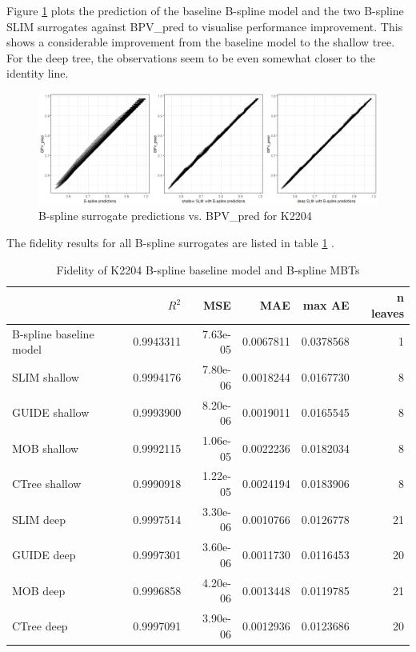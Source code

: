 Figure \ref{fig:ins_k2204_fit} plots the prediction of the baseline B-spline model and the two B-spline SLIM surrogates against BPV\_pred to visualise performance improvement. This shows a considerable improvement from the baseline model to the shallow tree. For the deep tree, the observations seem to be even somewhat closer to the identity line. 

\begin{figure}[!htb]
    \centering    
    \includegraphics[width = 14cm]{Figures/insurance_use_case/k2204_BPV/fit.png}
    \caption{B-spline surrogate predictions vs. BPV\_pred for K2204}
    \label{fig:ins_k2204_fit}
\end{figure}

The fidelity results for all B-spline surrogates are listed in table \ref{tab:ins_k2204_bsplines_surrogates_perf} .

\begin{table}

\caption{Fidelity of K2204 B-spline baseline model and  B-spline MBTs}
\centering \scriptsize
\begin{tabular}[t]{l|r|r|r|r|r}
\hline
  & $R^2$ & MSE & MAE & max AE & n leaves\\
\hline
B-spline baseline model & 0.9943311 & 7.63e-05 & 0.0067811 & 0.0378568 & 1\\
\hline
SLIM shallow & 0.9994176 & 7.80e-06 & 0.0018244 & 0.0167730 & 8\\
GUIDE shallow & 0.9993900 & 8.20e-06 & 0.0019011 & 0.0165545 & 8\\
MOB shallow & 0.9992115 & 1.06e-05 & 0.0022236 & 0.0182034 & 8\\
CTree shallow & 0.9990918 & 1.22e-05 & 0.0024194 & 0.0183906 & 8\\
\hline
SLIM deep & 0.9997514 & 3.30e-06 & 0.0010766 & 0.0126778 & 21\\
GUIDE deep & 0.9997301 & 3.60e-06 & 0.0011730 & 0.0116453 & 20\\
MOB deep & 0.9996858 & 4.20e-06 & 0.0013448 & 0.0119785 & 21\\
CTree deep & 0.9997091 & 3.90e-06 & 0.0012936 & 0.0123686 & 20\\
\hline
\end{tabular}
\label{tab:ins_k2204_bsplines_surrogates_perf}
\end{table}


